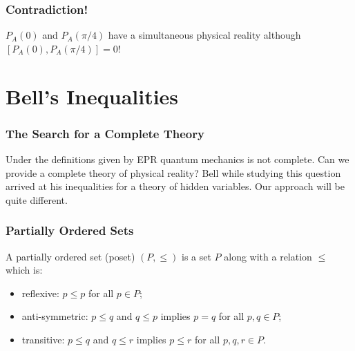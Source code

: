 \documentclass{beamer}
\begin{document}
\begin{frame}

	\frametitle{Contradiction!}
	
	$P_A(0)$ and $P_A(\pi/4)$ have a simultaneous physical reality although $[P_A(0),P_A(\pi/4)]=0$!

\end{frame}

\section{Bell's Inequalities}

\begin{frame}

	\frametitle{The Search for a Complete Theory}
	
	Under the definitions given by EPR quantum mechanics is not complete. Can we provide a complete theory of physical reality? Bell while studying this question arrived at his inequalities for a theory of hidden variables\cite{Bell1964}. Our approach will be quite different.

\end{frame}
	
\begin{frame}

	\frametitle{Partially Ordered Sets}
	
	\begin{definition}
	
		A partially ordered set (poset) $(P,\leq)$ is a set $P$ along with a relation $\leq$ which is:
		\begin{itemize}
		
			\item reflexive: $p\leq p$ for all $p\in P$;
			\item anti-symmetric: $p\leq q$ and $q\leq p$ implies $p=q$ for all $p,q\in P$;
			\item transitive: $p\leq q$ and $q\leq r$ implies $p\leq r$ for all $p,q,r\in P$.   		
		
		\end{itemize}			
	
	\end{definition}
	
\end{frame}
\end{document}
